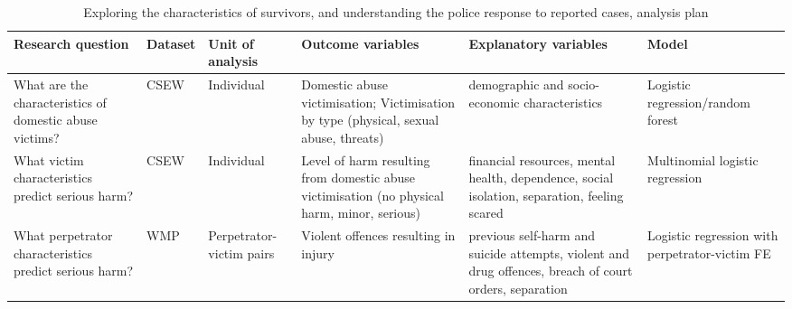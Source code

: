 \documentclass[11pt, a4paper]{article}
\begin{document}
\begin{table*}
\caption{Exploring the characteristics of survivors, and understanding the police response to reported cases, analysis plan}
  \begin{threeparttable}[t]
  \centering
       \begin{tabular}{ L{2.4cm}  C{1.4cm}  C{1.5cm}  C{3.6cm}  C{3.1cm}  C{2.6cm} }
    \toprule
     \textbf{Research question} & \textbf{Dataset}    & \textbf{Unit of analysis} & \textbf{Outcome variables} & \textbf{Explanatory variables} & \textbf{Model} \\
    \midrule
    What are the characteristics of domestic abuse victims? & CSEW & Individual  & Domestic abuse victimisation; Victimisation by type (physical, sexual abuse, threats) & demographic and socio-economic characteristics & Logistic regression/random forest \\
           \midrule
    What victim characteristics predict serious harm? & CSEW & Individual  & Level of harm resulting from domestic abuse victimisation (no physical harm, minor, serious) & financial resources, mental health, dependence, social isolation, separation, feeling scared & Multinomial logistic regression \\
                \midrule
                    What perpetrator characteristics predict serious harm? & WMP & Perpetrator-victim pairs & Violent offences resulting in injury & previous self-harm and suicide attempts, violent and drug offences, breach of court orders, separation &  Logistic regression with perpetrator-victim FE \\
     \bottomrule
  \end{tabular}
    \end{threeparttable}%
  \label{tab:addlabel}%
\end{table*}%
\end{document}
